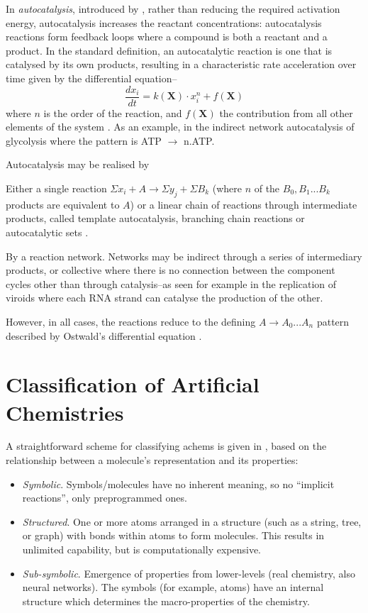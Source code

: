 In \emph{autocatalysis}, introduced by \textcite{Ostwald1890}, rather than reducing the required activation
energy, autocatalysis increases the reactant concentrations: autocatalysis reactions form feedback loops where a compound is both a
reactant and a product. In the standard definition, an autocatalytic reaction is one that is catalysed by its own products, resulting in a
characteristic rate acceleration over time given by the differential equation--
\[\frac{dx_i}{dt} = k(\mathbf{X}) \cdot x^n_i + f(\mathbf{X})\] where $n$ is the order of the reaction, and $f(\mathbf{X})$ the contribution from all other elements of the system \parencite{Plasson2010}. As an example, in the indirect network autocatalysis of glycolysis where the pattern is ATP \(\rightarrow\) n.ATP.

Autocatalysis may be realised by \begin{inparaenum}
	\item Either a single reaction \eg$\Sigma x_i + A\rightarrow \Sigma y_j + \Sigma B_k$ (where $n$ of the ${B_0, B_1...B_k}$ products are equivalent to $A$) or a linear chain of reactions through intermediate products, called template autocatalysis, branching chain reactions or autocatalytic sets \parencite{King1978}.
	\item By a reaction network. Networks may be indirect through a series of intermediary products, or collective where there is no connection between the component cycles other than through catalysis--as seen for example in the replication of viroids where each RNA strand can catalyse the production of the other.
\end{inparaenum}

However, in all cases, the reactions reduce to the defining $A \rightarrow A_0...A_n$ pattern described by Ostwald's differential equation \parencite{Plasson2010}.

\section{Classification of Artificial Chemistries}\label{classification-of-artificial-chemistries}

A straightforward scheme for classifying \glspl{achem} is given in \textcite{Faulconbridge2011}, based on the relationship between a molecule's representation and its properties:

\begin{itemize}
	\item \emph{Symbolic}. Symbols/molecules have no inherent meaning, so no ``implicit reactions'', only preprogrammed ones.	
	\item \emph{Structured}. One or more atoms arranged in a structure (such as a string, tree, or graph) with bonds within atoms to form molecules. This results in unlimited capability, but is computationally expensive.	
	\item \emph{Sub-symbolic}. Emergence of properties from lower-levels (\eg real chemistry, also neural networks). The symbols (for example, atoms) have an internal structure which determines the macro-properties of the chemistry.
\end{itemize}

